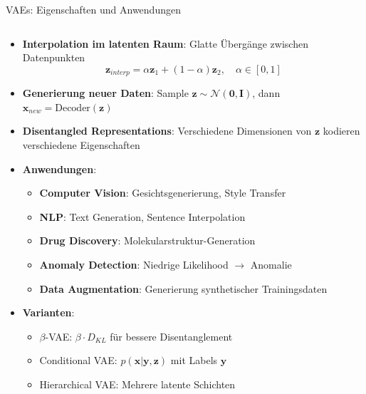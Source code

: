 \documentclass[aspectratio=1610, xcolor=dvipsnames, 9pt]{beamer}
\begin{document}
\begin{frame}{VAEs: Eigenschaften und Anwendungen}
  \begin{columns}
    \begin{column}{1\textwidth}
      \begin{itemize}
        \item \textbf{Interpolation im latenten Raum}: Glatte Übergänge zwischen Datenpunkten
        \begin{equation}
          \mathbf{z}_{interp} = \alpha \mathbf{z}_1 + (1-\alpha) \mathbf{z}_2, \quad \alpha \in [0,1]
        \end{equation}
        \item \textbf{Generierung neuer Daten}: Sample $\mathbf{z} \sim \mathcal{N}(\mathbf{0}, \mathbf{I})$, dann $\mathbf{x}_{new} = \text{Decoder}(\mathbf{z})$
        \item \textbf{Disentangled Representations}: Verschiedene Dimensionen von $\mathbf{z}$ kodieren verschiedene Eigenschaften
        \item \textbf{Anwendungen}:
        \begin{itemize}
          \item \textbf{Computer Vision}: Gesichtsgenerierung, Style Transfer
          \item \textbf{NLP}: Text Generation, Sentence Interpolation
          \item \textbf{Drug Discovery}: Molekularstruktur-Generation
          \item \textbf{Anomaly Detection}: Niedrige Likelihood $\rightarrow$ Anomalie
          \item \textbf{Data Augmentation}: Generierung synthetischer Trainingsdaten
        \end{itemize}
        \item \textbf{Varianten}:
        \begin{itemize}
          \item $\beta$-VAE: $\beta \cdot D_{KL}$ für bessere Disentanglement
          \item Conditional VAE: $p(\mathbf{x}|\mathbf{y}, \mathbf{z})$ mit Labels $\mathbf{y}$
          \item Hierarchical VAE: Mehrere latente Schichten
        \end{itemize}
      \end{itemize}
    \end{column}
  \end{columns}
\end{frame}
\end{document}
